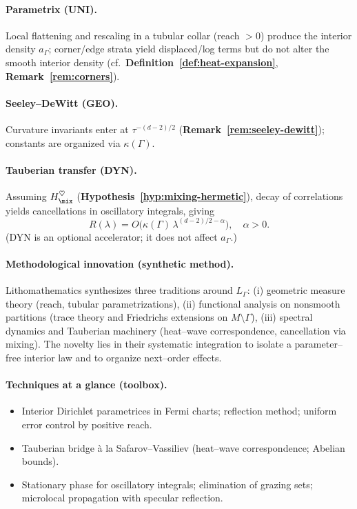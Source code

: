 \paragraph{Parametrix (UNI).}
Local flattening and rescaling in a tubular collar (reach $>$0) produce the interior density $a_\Gamma$; corner/edge strata yield displaced/log terms but do not alter the smooth interior density (cf.\ \textbf{Definition~\ref{def:heat-expansion}}, \textbf{Remark~\ref{rem:corners}}).

\paragraph{Seeley–DeWitt (GEO).}
Curvature invariants enter at $\tau^{-(d-2)/2}$ (\textbf{Remark~\ref{rem:seeley-dewitt}}); constants are organized via $\kappa(\Gamma)$.

\paragraph{Tauberian transfer (DYN).}
Assuming $H_{\mix}^{\heartsuit}$ (\textbf{Hypothesis~\ref{hyp:mixing-hermetic}}), decay of correlations yields cancellations in oscillatory integrals, giving
\[
R(\lambda)=O\!\big(\kappa(\Gamma)\,\lambda^{(d-2)/2-\alpha}\big),\quad \alpha>0.
\]
(DYN is an optional accelerator; it does not affect $a_\Gamma$.)

\paragraph{Methodological innovation (synthetic method).}
Lithomathematics synthesizes three traditions around $L_\Gamma$: (i) geometric measure theory (reach, tubular parametrizations), (ii) functional analysis on nonsmooth partitions (trace theory and Friedrichs extensions on $M\setminus\Gamma$), (iii) spectral dynamics and Tauberian machinery (heat–wave correspondence, cancellation via mixing). The novelty lies in their systematic integration to isolate a parameter–free interior law and to organize next–order effects.

\paragraph{Techniques at a glance (toolbox).}
\begin{itemize}
  \item Interior Dirichlet parametrices in Fermi charts; reflection method; uniform error control by positive reach.
  \item Tauberian bridge \`a la Safarov–Vassiliev (heat–wave correspondence; Abelian bounds).
  \item Stationary phase for oscillatory integrals; elimination of grazing sets; microlocal propagation with specular reflection.
\end{itemize}

